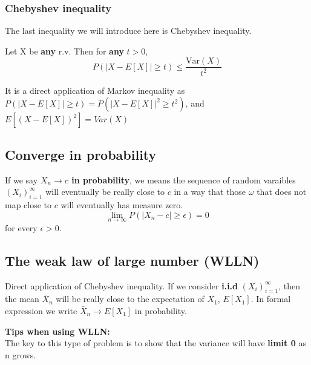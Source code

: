 \subsubsection*{Chebyshev inequality}
The last inequality we will introduce here is Chebyshev inequality.
\begin{note}
   Let X be \textbf{any} r.v. Then for \textbf{any} \(t > 0\),
   \[
    P(|X - E[X]| \geq t) \leq \frac{\text{Var} (X)}{t^2}
   \]  
\end{note}
It is a direct application of Markov inequality as \( P(|X - E[X]| \geq t) = P(|X - E[X]|^2 \geq t^2) \), and \(E[(X - E[X])^2] = Var(X)\) 
 

\subsection{Converge in probability}
If we say \textbf{ \(X_n \to c\) in probability}, we means the sequence of random varaibles \((X_i)_{i=1}^\infty\) will eventually be really close to \(c\) in a way that
those \(\omega \) that does not map close to \(c\) will eventually has measure zero. 
\[
    \lim\limits_{n \to \infty} P(|X_n -c| \geq \epsilon  ) = 0
\]    
for every \(\epsilon >0\). 
\subsection{The weak law of large number (WLLN)}
Direct application of Chebyshev inequality. If we consider \textbf{i.i.d} \((X_i)_{i=1}^{\infty} \), then the mean \(\bar{X}_n\) will be really close to the expectation of \(X_1\), \(E[X_1]\). 
In formal expression we write \(\bar{X}_n \to E[X_1]\) in probability. 

\textbf{Tips when using WLLN:}\\
The key to this type of problem is to show that the variance will have \textbf{limit 0} as n grows.  